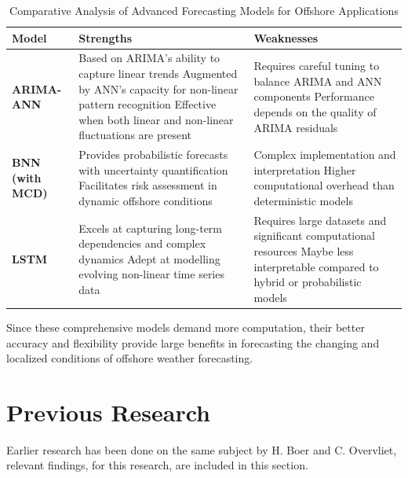 \begin{table}[h!]
\centering
\caption{Comparative Analysis of Advanced Forecasting Models for Offshore Applications}
\label{table:comparative_models}
\begin{tabular}{|p{2cm}|p{6.3cm}|p{6cm}|}
\hline
\centering \textbf{Model} & \textbf{Strengths} & \textbf{Weaknesses} \\ \hline 
\vspace{5pt}
\centering\textbf{ARIMA-ANN} & 
Based on ARIMA's ability to capture linear trends\newline
Augmented by ANN's capacity for non-linear pattern recognition\newline
Effective when both linear and non-linear fluctuations are present
& 
Requires careful tuning to balance ARIMA and ANN components\newline
Performance depends on the quality of ARIMA residuals \\ \hline
\vspace{5pt}
\centering\textbf{BNN (with MCD)} &
Provides probabilistic forecasts with uncertainty quantification\newline
Facilitates risk assessment in dynamic offshore conditions
& 
Complex implementation and interpretation\newline
Higher computational overhead than deterministic models \\ \hline
\vspace{5pt}
\centering\textbf{LSTM} &
Excels at capturing long-term dependencies and complex dynamics\newline
Adept at modelling evolving non-linear time series data
& 
Requires large datasets and significant computational resources\newline
Maybe less interpretable compared to hybrid or probabilistic models \\ \hline
\end{tabular}
\end{table}

\noindent Since these comprehensive models demand more computation, their better accuracy and flexibility provide large benefits in forecasting the changing and localized conditions of offshore weather forecasting.

\section{Previous Research}
\label{lit:previous}
Earlier research has been done on the same subject by H. Boer and C. Overvliet, relevant findings, for this research, are included in this section.

